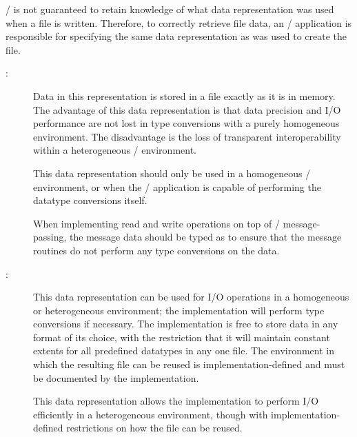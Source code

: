 \begin{users}
\MPI/ is not
guaranteed to retain knowledge of what data
representation was used when a file is written.
Therefore, to correctly retrieve file data, an \MPI/
application is responsible for specifying the same data
representation as was used to create the file. 
\end{users}

\begin{description}
\item[:]
%
Data in this representation is stored in a file exactly
as it is in memory.
The advantage of this data representation is that
data precision and I/O performance are not lost in type conversions
with a purely homogeneous environment.
The disadvantage is the loss of transparent interoperability within a
heterogeneous \MPI/ environment.

\begin{users}
This data representation should only be used in a homogeneous
\MPI/ environment, or when the \MPI/ application is capable of performing
the datatype conversions itself.
\end{users}

\begin{implementors}
When implementing read and write operations
on top of \MPI/ message-passing, the message data should be typed as
 to ensure that the message routines do not perform any
type conversions on the data.
\end{implementors}

\item[:]
%
This data representation can be used for I/O operations in a homogeneous or
heterogeneous environment; the implementation will perform type
conversions if necessary. The implementation is free to store data in
any format of its choice,
with the restriction that it will maintain constant extents
for all predefined datatypes in any one file.
The environment in which the resulting file 
can be reused is implementation-defined
and must be documented by the implementation.

\begin{rationale}
This data representation allows the implementation
to perform I/O efficiently in a
heterogeneous environment, though with implementation-defined
restrictions on how the file can be reused.
\end{rationale}


\end{description}
